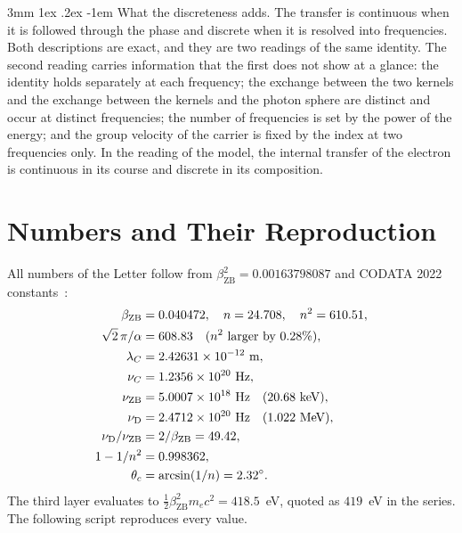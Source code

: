 \documentclass[%
 reprint, amsmath,amssymb, aps, prb, ]{revtex4-2}
\makeatletter
\numberwithin{equation}{section}
\renewcommand\paragraph{%
  \@startsection{paragraph}{4}{\z@}%
    {3mm \@plus 1ex \@minus .2ex}%
    {-1em}%
    {\normalfont\normalsize\itshape}}
\makeatother
\begin{document}
\paragraph{What the discreteness adds.} The transfer is continuous when it is followed through the phase and discrete when it is resolved into frequencies. Both descriptions are exact, and they are two readings of the same identity. The second reading carries information that the first does not show at a glance: the identity holds separately at each frequency; the exchange between the two kernels and the exchange between the kernels and the photon sphere are distinct and occur at distinct frequencies; the number of frequencies is set by the power of the energy; and the group velocity of the carrier is fixed by the index at two frequencies only. In the reading of the model, the internal transfer of the electron is continuous in its course and discrete in its composition.

\section{Numbers and Their Reproduction}
\label{app:numbers}

All numbers of the Letter follow from $\beta_{\text{ZB}}^2 = 0.00163798087$ and CODATA 2022 constants~\cite{CODATA2022}:
\begin{align}
\beta_{\text{ZB}} &= 0.040472, \quad n = 24.708, \quad n^2 = 610.51,
\notag\\
\sqrt{2}\,\pi/\alpha &= 608.83 \quad (n^2 \text{ larger by } 0.28\%),
\notag\\
\lambda_C &= 2.42631\times10^{-12}\ \text{m},
\notag\\
\nu_C &= 1.2356\times10^{20}\ \text{Hz},
\notag\\
\nu_{\text{ZB}} &= 5.0007\times10^{18}\ \text{Hz} \quad (20.68\ \text{keV}),
\notag\\
\nu_{\text{D}} &= 2.4712\times10^{20}\ \text{Hz} \quad (1.022\ \text{MeV}),
\notag\\
\nu_{\text{D}}/\nu_{\text{ZB}} &= 2/\beta_{\text{ZB}} = 49.42,
\notag\\
1 - 1/n^2 &= 0.998362,
\notag\\
\theta_c &= \arcsin(1/n) = 2.32^\circ .
\label{eq:allnumbers}
\end{align}
The third layer evaluates to $\tfrac12\beta_{\text{ZB}}^2 m_ec^2 = 418.5$~eV, quoted as $419$~eV in the series. The following script reproduces every value.
\end{document}

